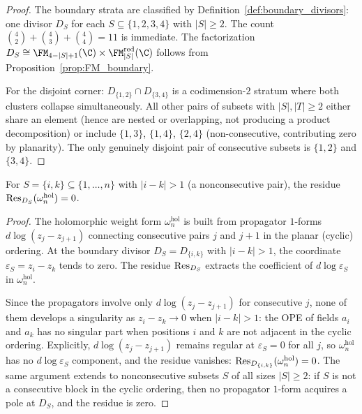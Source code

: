 \begin{proof}
The boundary strata are classified by
Definition~\ref{def:boundary_divisors}: one divisor $D_S$ for
each $S \subseteq \{1,2,3,4\}$ with $|S| \ge 2$. The count
$\binom{4}{2} + \binom{4}{3} + \binom{4}{4} = 11$ is immediate.
The factorization $D_S \cong \FM_{4-|S|+1}(\C) \times \FM_{|S|}^{\mathrm{red}}(\C)$
follows from Proposition~\ref{prop:FM_boundary}.

For the disjoint corner: $D_{\{1,2\}} \cap D_{\{3,4\}}$ is
a codimension-$2$ stratum where both clusters collapse
simultaneously. All other pairs of subsets with
$|S|, |T| \ge 2$ either share an element (hence are nested
or overlapping, not producing a product decomposition) or
include $\{1,3\}$, $\{1,4\}$, $\{2,4\}$ (non-consecutive,
contributing zero by planarity). The only genuinely disjoint
pair of consecutive subsets is $\{1,2\}$ and $\{3,4\}$.
\end{proof}

\begin{lemma}%
For $S = \{i,k\} \subseteq \{1,\ldots,n\}$ with $|i-k| > 1$
\textup{(}a nonconsecutive pair\textup{)}, the residue
$\operatorname{Res}_{D_S}(\omega_n^{\mathrm{hol}}) = 0$.
\end{lemma}

\begin{proof}
The holomorphic weight form $\omega_n^{\mathrm{hol}}$ is built
from propagator $1$-forms $d\log(z_j - z_{j+1})$ connecting
consecutive pairs $j$ and $j+1$ in the planar (cyclic) ordering.
At the boundary divisor $D_S = D_{\{i,k\}}$ with $|i-k| > 1$,
the coordinate $\varepsilon_S = z_i - z_k$ tends to zero.
The residue $\operatorname{Res}_{D_S}$ extracts the coefficient of
$d\log\varepsilon_S$ in $\omega_n^{\mathrm{hol}}$.

Since the propagators involve only $d\log(z_j - z_{j+1})$
for consecutive $j$, none of them develops a singularity
as $z_i - z_k \to 0$ when $|i-k| > 1$: the OPE of
fields $a_i$ and $a_k$ has no singular part when positions
$i$ and $k$ are not adjacent in the cyclic ordering.
Explicitly, $d\log(z_j - z_{j+1})$ remains regular at
$\varepsilon_S = 0$ for all $j$, so
$\omega_n^{\mathrm{hol}}$ has no $d\log\varepsilon_S$
component, and the residue vanishes:
$\operatorname{Res}_{D_{\{i,k\}}}(\omega_n^{\mathrm{hol}}) = 0$.
The same argument extends to nonconsecutive subsets
$S$ of all sizes $|S| \geq 2$: if $S$ is not a
consecutive block in the cyclic ordering, then no
propagator $1$-form acquires a pole at $D_S$, and the
residue is zero.
\end{proof}

